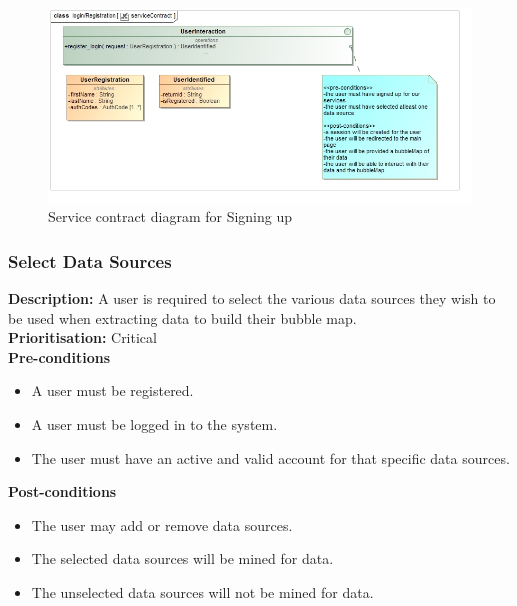 \documentclass[hidelinks,english]{article}
\begin{document}
    			\begin{figure}[!h]
    			\includegraphics[width=\linewidth]{login_RegistrationServiceContract.jpg}
    			\caption{Service contract diagram for Signing up}
    			\label{ServiceContractSignUp}
    			\end{figure}
    			
    		\subsubsection{Select Data Sources}
				\textbf{Description:}  A user is required to select the various data sources they wish to be used when extracting data to build their bubble map.\\
    			\textbf{Prioritisation:} Critical\\
      			\textbf{Pre-conditions}
    			\begin{itemize}
        			\item A user must be registered.
        			\item A user must be logged in to the system.
        			\item The user must have an active and valid account for that specific data sources.
    			\end{itemize}
    			\textbf{Post-conditions}
     			\begin{itemize}
        			\item The user may add or remove data sources.
        			\item The selected data sources will be mined for data.
        			\item The unselected data sources will not be mined for data.
    			\end{itemize}
\end{document}
